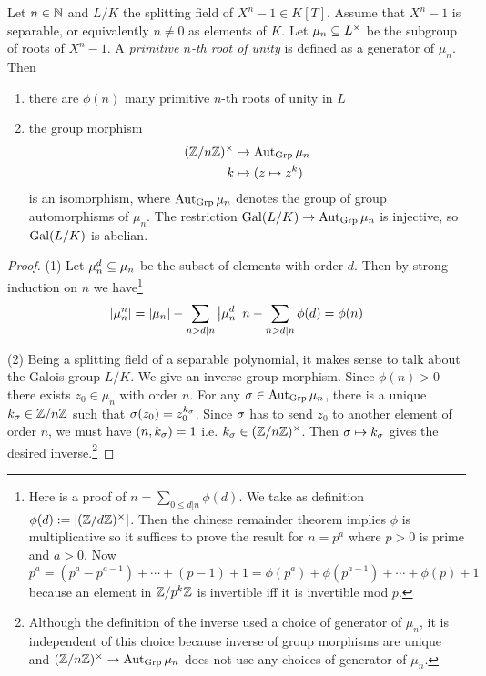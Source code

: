 \documentclass{article}
\begin{document}
\begin{prop}
  
  Let $n \in \mathbb{N}$ and $L / K$ the splitting field of $X^n - 1 \in K[T]$.
  Assume that $X^n - 1$ is separable,
  or equivalently $n \neq 0$ as elements of $K$.
  Let $\mu_n \subseteq L^\times$ be the subgroup of roots of $X^n - 1$.
  A \emph{primitive $n$-th root of unity} is defined as a generator of $\mu_n$.
  Then 
  \begin{enumerate}
    \item there are $\phi(n)$ many primitive $n$-th roots of unity in $L$
    \item the group morphism \begin{align*}
      (\mathbb{Z} / n \mathbb{Z})^\times &\to \operatorname{Aut}_{\mathrm{Grp}} \mu_n \\
      k &\mapsto (z \mapsto z^k)
    \end{align*}
    is an isomorphism,
    where $\operatorname{Aut}_{\mathrm{Grp}} \mu_n$ denotes the group of group automorphisms
    of $\mu_n$.
    The restriction $\operatorname{Gal}(L / K) \to \operatorname{Aut}_{\mathrm{Grp}} \mu_n$ is injective,
    so $\operatorname{Gal}(L / K)$ is abelian.
  \end{enumerate}
\end{prop}
\begin{proof}
  (1) Let $\mu_n^d \subseteq \mu_n$ be the subset of elements with order $d$.
  Then by strong induction on $n$ we have\footnote{
    Here is a proof of $n = \sum_{0 \leq d \vert n} \phi(d)$.
    We take as definition $\phi(d) := \left\vert (\mathbb{Z} / d \mathbb{Z})^\times \right\vert$.
    Then the chinese remainder theorem implies $\phi$ is multiplicative
    so it suffices to prove the result for $n = p^a$ where $p > 0$ is prime
    and $a > 0$.
    Now $p^a = (p^a - p^{a - 1}) + \cdots + (p - 1) + 1
    = \phi(p^a) + \phi(p^{a-1}) + \cdots + \phi(p) + 1$
    because an element in $\mathbb{Z} / p^k \mathbb{Z}$ is invertible
    iff it is invertible mod $p$.
  } \[
    \left\vert \mu_n^n \right\vert = \left\vert \mu_n \right\vert - \sum_{n > d \vert n} \left\vert \mu_n^d \right\vert
    n - \sum_{n > d \vert n} \phi(d) = \phi(n)
  \]

  (2) Being a splitting field of a separable polynomial,
  it makes sense to talk about the Galois group $L / K$.
  We give an inverse group morphism.
  Since $\phi(n) > 0$ there exists $z_0 \in \mu_n$ with order $n$.
  For any $\sigma \in \operatorname{Aut}_{\mathrm{Grp}} \mu_n$,
  there is a unique $k_\sigma \in \mathbb{Z} / n\mathbb{Z}$ such that
  $\sigma(z_0) = z_0^{k_\sigma}$.
  Since $\sigma$ has to send $z_0$ to another element of order $n$,
  we must have $(n , k_\sigma) = 1$ i.e. $k_\sigma \in (\mathbb{Z} / n \mathbb{Z})^\times$.
  Then $\sigma \mapsto k_\sigma$ gives the desired inverse.\footnote{
    Although the definition of the inverse used a choice of 
    generator of $\mu_n$, it is independent of this choice because
    inverse of group morphisms are unique and
    $(\mathbb{Z} / n \mathbb{Z})^\times \to \operatorname{Aut}_{\mathrm{Grp}} \mu_n$ does not
    use any choices of generator of $\mu_n$.
  }
\end{proof}
\end{document}

